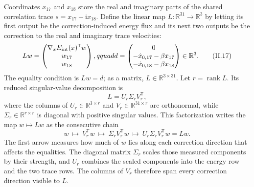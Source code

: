 \documentclass[10pt,letterpaper,twocolumn]{article}
\newcommand{\R}{\mathbb R}
\newcommand{\ii}{\mathrm i}
\begin{document}
Coordinates \(x_{17}\) and \(x_{18}\) store the real and imaginary parts of
the shared correlation trace \(s=x_{17}+\ii x_{18}\).  Define the linear map
\(L:\R^{31}\to\R^3\) by letting its first output be the correction-induced
energy flux and its next two outputs be the correction to the real and
imaginary trace velocities:
{\footnotesize
\[
Lw=
\begin{pmatrix}
\nabla_xE_{\rm int}(x)^{\mathsf T}w\\
w_{17}\\
w_{18}
\end{pmatrix}
,qquad
d=
\begin{pmatrix}
0\\
-\dot x_{0,17}-\beta x_{17}\\
-\dot x_{0,18}-\beta x_{18}
\end{pmatrix}
\in\R^3.
\tag{II.17}
\]
}
The equality condition is \(Lw=d\); as a matrix,
\(L\in\R^{3\times31}\).  Let \(r=\operatorname{rank}L\).  Its reduced singular-value
decomposition is
\[
L=U_r\Sigma_rV_r^{\mathsf T},
\tag{II.18}
\]
where the columns of \(U_r\in\R^{3\times r}\) and
\(V_r\in\R^{31\times r}\) are orthonormal, while
\(\Sigma_r\in\R^{r\times r}\) is diagonal with positive singular values.
This factorization writes the map \(w\mapsto Lw\) as the consecutive chain
\[
w\ \longmapsto\ V_r^{\mathsf T}w
\ \longmapsto\ \Sigma_rV_r^{\mathsf T}w
\ \longmapsto\ U_r\Sigma_rV_r^{\mathsf T}w=Lw.
\tag{II.18a}
\]
The first arrow measures how much of \(w\) lies along each correction
direction that affects the equalities.  The diagonal matrix \(\Sigma_r\)
scales those measured components by their strength, and \(U_r\) combines the
scaled components into the energy row and the two trace rows.  The columns of
\(V_r\) therefore span every correction direction visible to \(L\).
\end{document}
